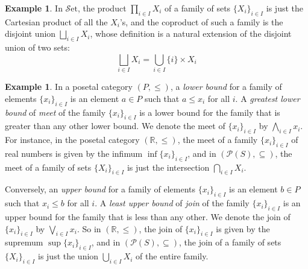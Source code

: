 \documentclass[10pt,oneside]{book}
\def\~#1{\mathscr{#1}}
\newcommand{\R}{\mathbb{R}}
\newcommand{\Set}{\~S\mathrm{et}}
\theoremstyle{plain}
\theoremstyle{definition}
\newtheorem{ex}[thm]{Example}
\theoremstyle{remark}
\numberwithin{equation}{section}
\numberwithin{figure}{section}
\begin{document}
\begin{ex}
In $\Set$, the product $\prod_{i \in I} X_i$ of a family of sets $\{X_i\}_{i \in I}$ is just the Cartesian product of all the $X_i$'s, and the coproduct of such a family is the disjoint union $\bigsqcup_{i \in I} X_i$, whose definition is a natural extension of the disjoint union of two sets:
\[\bigsqcup_{i \in I} X_i = \bigcup_{i \in I} \{i\} \times X_i\]
\end{ex}
\begin{ex}
In a posetal category $(P, \leq)$, a \emph{lower bound} for a family of elements $\{x_i\}_{i \in I}$ is an element $a \in P$ such that $a \leq x_i$ for all $i$. A \emph{greatest lower bound} of \emph{meet} of the family $\{x_i\}_{i \in I}$ is a lower bound for the family that is greater than any other lower bound. We denote the meet of $\{x_i\}_{i \in I}$ by $\bigwedge_{i \in I} x_i$. For instance, in the posetal category $(\R, \leq)$, the meet of a family $\{x_i\}_{i \in I}$ of real numbers is given by the infimum $\inf\{x_i\}_{i \in I}$, and in $(\~P(S), \subseteq)$, the meet of a family of sets $\{X_i\}_{i \in I}$ is just the intersection $\bigcap_{i \in I} X_i$.

Conversely, an \emph{upper bound} for a family of elements $\{x_i\}_{i \in I}$ is an element $b \in P$ such that $x_i \leq b$ for all $i$. A \emph{least upper bound} of \emph{join} of the family $\{x_i\}_{i \in I}$ is an upper bound for the family that is less than any other. We denote the join of $\{x_i\}_{i \in I}$ by $\bigvee_{i \in I} x_i$. So in $(\R, \leq)$, the join of $\{x_i\}_{i \in I}$ is given by the supremum $\sup\{x_i\}_{i \in I}$, and in $(\~P(S), \subseteq)$, the join of a family of sets $\{X_i\}_{i \in I}$ is just the union $\bigcup_{i \in I} X_i$ of the entire family.
\end{ex}
\end{document}
